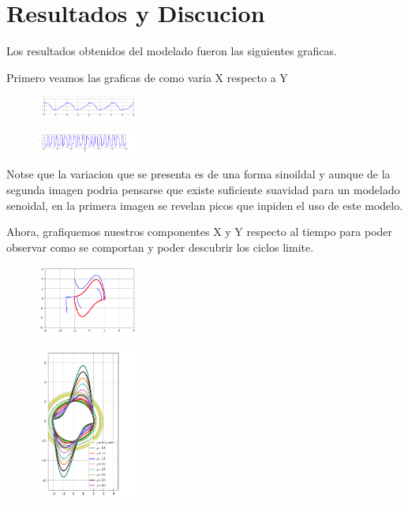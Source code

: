 \documentclass[a4paper]{article}
\begin{document}
\section{ Resultados y Discucion}


Los resultados obtenidos del modelado fueron las siguientes graficas. 

Primero veamos las graficas de como varia X respecto a Y


\begin{figure}[ht!]
\centering
\includegraphics[width=0.3\textwidth]{G1.png}
\end{figure}

\begin{figure}[ht!]
\centering
\includegraphics[width=0.3\textwidth]{G2.png}
\end{figure}

Notse que la variacion que se presenta es de una forma sinoildal y aunque de la segunda  imagen podria pensarse que existe suficiente suavidad para un modelado senoidal, en la primera imagen se revelan picos que inpiden el uso de este modelo.
\linebreak

Ahora, grafiquemos nuestros componentes X y Y respecto al tiempo para poder observar como se comportan y poder descubrir los ciclos limite.

\begin{figure}[ht!]
\centering
\includegraphics[width=0.3\textwidth]{G3.png}
\end{figure}

\begin{figure}[ht!]
\centering
\includegraphics[width=0.3\textwidth]{G4.png}
\end{figure}
\end{document}
